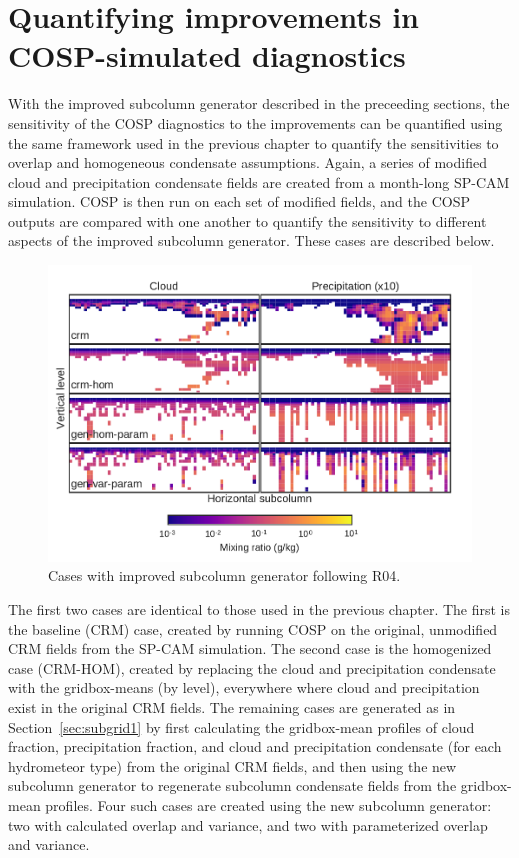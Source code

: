 \section{Quantifying improvements in COSP-simulated
diagnostics}\label{sec:subgrid2Results}

With the improved subcolumn generator described in the preceeding
sections, the sensitivity of the COSP diagnostics to the improvements
can be quantified using the same framework used in the previous chapter
to quantify the sensitivities to overlap and homogeneous condensate
assumptions. Again, a series of modified cloud and precipitation
condensate fields are created from a month-long SP-CAM simulation. COSP
is then run on each set of modified fields, and the COSP outputs are
compared with one another to quantify the sensitivity to different
aspects of the improved subcolumn generator. These cases are described
below.

\begin{figure}[htbp]
\centering
\includegraphics{graphics/subgrid2_mxratio_example.pdf}
\caption{\label{fig:subgrid2_mxratio_example}Cases with improved
subcolumn generator following
R04.}\label{fig:subgrid2ux5fmxratioux5fexample}
\end{figure}

The first two cases are identical to those used in the previous chapter.
The first is the baseline (CRM) case, created by running COSP on the
original, unmodified CRM fields from the SP-CAM simulation. The second
case is the homogenized case (CRM-HOM), created by replacing the cloud
and precipitation condensate with the gridbox-means (by level),
everywhere where cloud and precipitation exist in the original CRM
fields. The remaining cases are generated as in
Section~\ref{sec:subgrid1} by first calculating the gridbox-mean
profiles of cloud fraction, precipitation fraction, and cloud and
precipitation condensate (for each hydrometeor type) from the original
CRM fields, and then using the new subcolumn generator to regenerate
subcolumn condensate fields from the gridbox-mean profiles. Four such
cases are created using the new subcolumn generator: two with calculated
overlap and variance, and two with parameterized overlap and variance.

